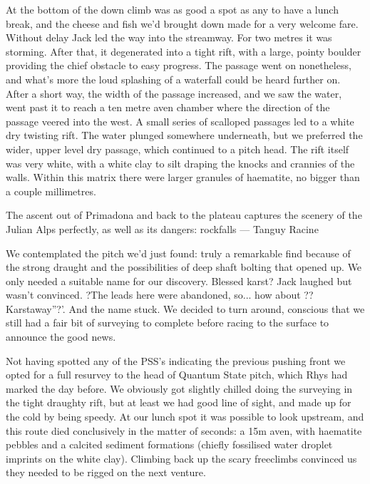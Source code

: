 At the bottom of the down climb was as good a spot as any to have a lunch break, and the cheese and fish we'd brought down made for a very welcome fare. Without delay Jack led the way into the streamway. For two metres it was storming. After that, it degenerated into a tight rift, with a large, pointy boulder providing the chief obstacle to easy progress. The passage went on nonetheless, and what's more the loud splashing of a waterfall could be heard further on. After a short way, the width of the passage increased, and we saw the water, went past it to reach a ten metre aven chamber where the direction of the passage veered into the west. A small series of scalloped passages led to a white dry twisting rift. The water plunged somewhere underneath, but we preferred the wider, upper level dry passage, which continued to a pitch head. The rift itself was very white, with a white clay to silt draping the knocks and crannies of the walls. Within this matrix there were larger granules of haematite, no bigger than a couple millimetres. 

\begin{marginfigure}
\centering
{}
\caption{The ascent out of Primadona and back to the plateau captures the scenery of the Julian Alps perfectly, as well as its dangers: rockfalls --- Tanguy Racine}
\label{teapot}
\end{marginfigure}

We contemplated the pitch we'd just found: truly a remarkable find because of the strong draught and the possibilities of deep shaft bolting that opened up. We only needed a suitable name for our discovery. Blessed karst? Jack laughed but wasn't convinced. ?The leads here were abandoned, so... how about ??Karstaway''?'. And the name stuck. We decided to turn around, conscious that we still had a fair bit of surveying to complete before racing to the surface to announce the good news. 


Not having spotted any of the PSS's indicating the previous pushing front we opted for a full resurvey to the head of Quantum State pitch, which Rhys had marked the day before. We obviously got slightly chilled doing the surveying in the tight draughty rift, but at least we had good line of sight, and made up for the cold by being speedy. At our lunch spot it was possible to look upstream, and this route died conclusively in the matter of seconds: a 15m aven, with haematite pebbles and a calcited sediment formations (chiefly fossilised water droplet imprints on the white clay). Climbing back up the scary freeclimbs convinced us they needed to be rigged on the next venture. 

